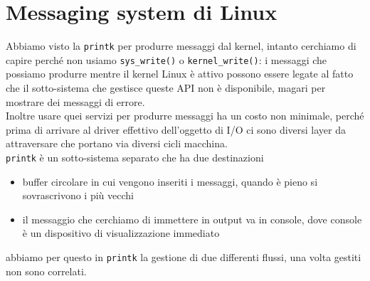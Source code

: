 \documentclass[12pt, oneside]{extbook}
\begin{document}
\section{Messaging system di Linux}
Abbiamo visto la \texttt{\texttt{printk}} per produrre messaggi dal kernel, intanto cerchiamo di capire perché non usiamo \texttt{sys\_write()} o \texttt{kernel\_write()}: i messaggi che possiamo produrre mentre il kernel Linux è attivo possono essere legate al fatto che il sotto-sistema che gestisce queste API non è disponibile, magari per mostrare dei messaggi di errore.\\Inoltre usare quei servizi per produrre messaggi ha un costo non minimale, perché prima di arrivare al driver effettivo dell'oggetto di I/O ci sono diversi layer da attraversare che portano via diversi cicli macchina.\\ \texttt{printk} è un sotto-sistema separato che ha due destinazioni
\begin{itemize}
\item buffer circolare in cui vengono inseriti i messaggi, quando è pieno si sovrascrivono i più vecchi
\item il messaggio che cerchiamo di immettere in output va in console, dove console è un dispositivo di visualizzazione immediato
\end{itemize}
abbiamo per questo in \texttt{printk} la gestione di due differenti flussi, una volta gestiti non sono correlati.
\end{document}
